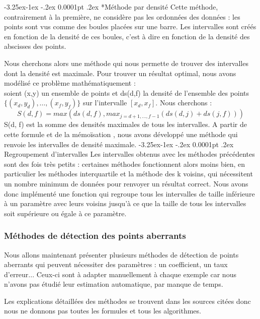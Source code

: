 \documentclass[a4paper,12pt]{article} %
\makeatletter
\renewcommand\paragraph{\@startsection{paragraph}{4}{\z@}%
                                      {-3.25ex\@plus -1ex \@minus -.2ex}%
                                      {0.0001pt \@plus .2ex}%
                                      {\normalfont\normalsize\bfseries}}
\renewcommand\subparagraph{\@startsection{subparagraph}{5}{\z@}%
                                      {-3.25ex\@plus -1ex \@minus -.2ex}%
                                      {0.0001pt \@plus .2ex}%
                                      {\normalfont\normalsize\bfseries}}
\makeatother
\begin{document}
			        \subparagraph*{Méthode par densité}
    				    Cette méthode, contrairement à la première, ne considère pas les ordonnées des données : les points sont vus comme des boules placées sur une barre. Les intervalles sont créés en fonction de la densité de ces boules, c'est à dire en fonction de la densité des abscisses des points.
    				    
                        Nous cherchons alors une méthode qui nous permette de trouver des intervalles dont la densité est maximale. Pour trouver un résultat optimal, nous avons modélisé ce problème mathématiquement :\\
                        soient (x,y) un ensemble de points et ds(d,f) la densité de l'ensemble des points $\{( x_d, y_d),…,( x_f, y_f ) \}$ sur l'intervalle $[ x_d,x_f]$. Nous cherchons :
                        $$S(d,f)= max (ds(d,f),max_{j=d+1,...,f-1}(ds(d,j)+ds(j,f)))$$
                        S(d, f) est la somme des densités maximales de tous les intervalles. 
                      A partir de cette formule et de la mémoïsation \cite{algo}, nous avons développé une méthode qui renvoie les intervalles de densité maximale. 
				    \paragraph{Regroupement d'intervalles}
				        Les intervalles obtenus avec les méthodes précédentes sont des fois très petits : certaines méthodes fonctionnent alors moins bien, en particulier les méthodes interquartile et la méthode des k voisins, qui nécessitent un nombre minimum de données pour renvoyer un résultat correct. Nous avons donc implémenté une fonction qui regroupe tous les intervalles de taille inférieure à un paramètre avec leurs voisins jusqu'à ce que la taille de tous les intervalles soit supérieure ou égale à ce paramètre. 
				        
				\subsubsection{\label{meth}Méthodes de détection des points aberrants}
    			    Nous allons maintenant présenter plusieurs méthodes de détection de points aberrants qui peuvent nécessiter des paramètres : un coefficient, un taux d'erreur... Ceux-ci sont à adapter manuellement à chaque exemple car nous n'avons pas étudié leur estimation automatique, par manque de temps.
    			    
    			    Les explications détaillées des méthodes se trouvent dans les sources citées donc nous ne donnons pas toutes les formules et tous les algorithmes.
                    
\end{document}
